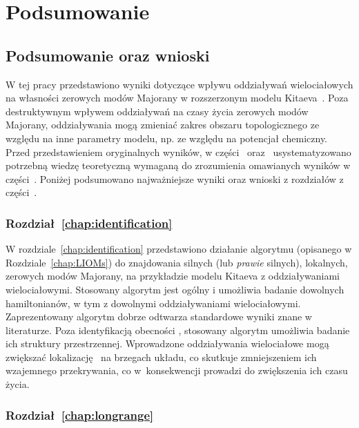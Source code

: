 \chapter*{Podsumowanie}





\section*{Podsumowanie oraz wnioski}

W tej pracy przedstawiono wyniki dotyczące wpływu oddziaływań wielociałowych na własności zerowych modów Majorany w rozszerzonym modelu Kitaeva~\cite{kitaev.2001}.
Poza destruktywnym wpływem oddziaływań na czasy życia zerowych modów Majorany, oddziaływania mogą zmieniać zakres obszaru topologicznego ze względu na inne parametry modelu, np. ze względu na potencjał chemiczny.
Przed przedstawieniem oryginalnych wyników, w części~\hyperref[part:I]{} oraz~\hyperref[part:II]{} usystematyzowano potrzebną wiedzę teoretyczną wymaganą do zrozumienia omawianych wyników w części~\hyperref[part:III]{}.
Poniżej podsumowano najważniejsze wyniki oraz wnioski z rozdziałów z części~\hyperref[part:IV]{}.

\subsection*{Rozdział~\ref{chap:identification}}

W rozdziale~\ref{chap:identification} przedstawiono działanie algorytmu (opisanego w Rozdziale~\ref{chap:LIOMs}) do znajdowania silnych (lub \textit{prawie} silnych), lokalnych, zerowych modów Majorany, na przykładzie modelu Kitaeva z oddziaływaniami wielociałowymi.
Stosowany algorytm jest ogólny i umożliwia badanie dowolnych hamiltonianów, w tym z dowolnymi oddziaływaniami wielociałowymi.
Zaprezentowany algorytm dobrze odtwarza standardowe wyniki znane w literaturze. 
Poza identyfikacją obecności \MZM, stosowany algorytm umożliwia badanie ich struktury przestrzennej.
Wprowadzone oddziaływania wielociałowe mogą zwiększać lokalizację \MZM\ na brzegach układu, co skutkuje zmniejszeniem ich wzajemnego przekrywania, co w~konsekwencji prowadzi do zwiększenia ich czasu życia.


\subsection*{Rozdział~\ref{chap:longrange}}

